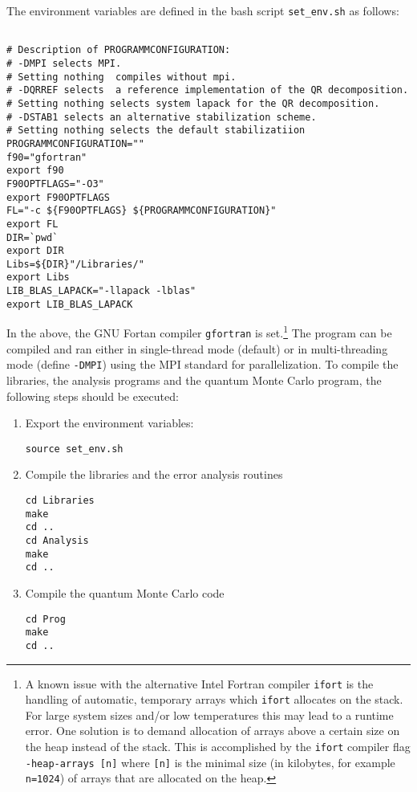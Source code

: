 The environment variables are defined in the bash script \texttt{set\_env.sh} as follows:
\lstset{style=custombash}
\begin{lstlisting}

# Description of PROGRAMMCONFIGURATION:
# -DMPI selects MPI.
# Setting nothing  compiles without mpi.
# -DQRREF selects  a reference implementation of the QR decomposition. 
# Setting nothing selects system lapack for the QR decomposition.
# -DSTAB1 selects an alternative stabilization scheme.
# Setting nothing selects the default stabilizatiion
PROGRAMMCONFIGURATION=""
f90="gfortran"
export f90
F90OPTFLAGS="-O3"
export F90OPTFLAGS
FL="-c ${F90OPTFLAGS} ${PROGRAMMCONFIGURATION}"
export FL
DIR=`pwd`
export DIR
Libs=${DIR}"/Libraries/"
export Libs
LIB_BLAS_LAPACK="-llapack -lblas"
export LIB_BLAS_LAPACK

\end{lstlisting}
In the above, the GNU Fortan compiler \texttt{gfortran} is set.\footnote{A known issue with the alternative Intel Fortran compiler \texttt{ifort} is the handling of automatic, temporary arrays 
which \texttt{ifort} allocates on the stack. For large system sizes and/or low temperatures this may lead to 
a runtime error. One solution is to demand allocation of arrays above a certain size on the heap instead of the stack. 
This is accomplished by the \texttt{ifort} compiler flag \texttt{-heap-arrays [n]} where \texttt{[n]} is the minimal size (in kilobytes, for example \texttt{n=1024}) of arrays 
that are allocated on the heap.}
The program can be compiled and ran either in single-thread mode (default) or 
in multi-threading mode (define \texttt{-DMPI}) using the MPI standard for parallelization.
To compile the libraries, the analysis programs and the quantum Monte Carlo program, the following steps should be executed:
\begin{enumerate}
\item Export  the environment variables:
\begin{verbatim}
source set_env.sh
\end{verbatim}
\item Compile the libraries and the error analysis routines
\begin{verbatim}
cd Libraries
make
cd ..
cd Analysis
make
cd ..
\end{verbatim}
\item Compile the quantum Monte Carlo code
\begin{verbatim}
cd Prog
make
cd ..
\end{verbatim}
\end{enumerate}

